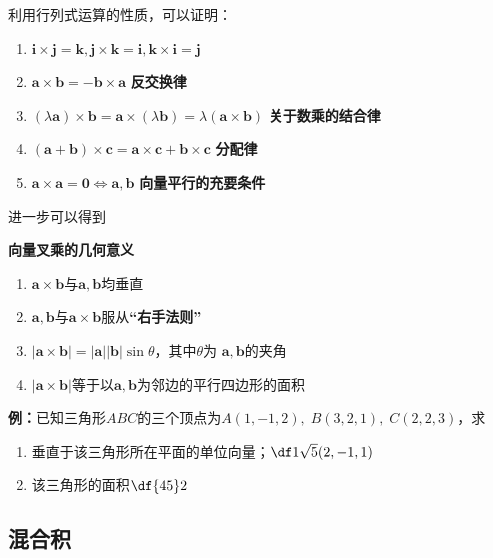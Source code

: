 利用行列式运算的性质，可以证明：
\begin{thx}
	\begin{enumerate}
	  \item $\bm{i}\times\bm{j}=\bm{k},\bm{j}\times\bm{k}=\bm{i},
		\bm{k}\times\bm{i}=\bm{j}$
	  \item $\bm{a}\times\bm{b}=-\bm{b}\times\bm{a}$
	  \hfill {\bf 反交换律}
	  \item 
	  $(\lambda\bm{a})\times\bm{b}=\bm{a}\times(\lambda\bm{b})
	  =\lambda(\bm{a}\times\bm{b})$
	  \hfill {\bf 关于数乘的结合律}
	  \item 
	  $(\bm{a}+\bm{b})\times\bm{c}=\bm{a}\times\bm{c}+\bm{b}\times\bm{c}$
	  \hfill {\bf 分配律}
	  \item $\bm{a}\times\bm{a}=\bm{0}\Leftrightarrow\bm{a},\bm{b}$
	  \hfill {\bf 向量平行的充要条件}
	\end{enumerate}
\end{thx}

进一步可以得到
\begin{thx}
	{\bf 向量叉乘的几何意义}
	\begin{enumerate}%
	  \item $\bm{a}\times\bm{b}$与$\bm{a},\bm{b}$均垂直
	  \item $\bm{a},\bm{b}$与$\bm{a}\times\bm{b}$服从{\bf “右手法则”}
	  \item $|\bm{a}\times\bm{b}|=|\bm{a}||\bm{b}|\sin\theta$，其中$\theta$为
	  $\bm{a},\bm{b}$的夹角
	  \item $|\bm{a}\times\bm{b}|$等于以$\bm{a},\bm{b}$为邻边的平行四边形的面积
	\end{enumerate}
\end{thx}

{\bf 例：}已知三角形$ABC$的三个顶点为$A(1,-1,2),\;B(3,2,1),\;C(2,2,3)$，求
\begin{enumerate}[(1)]
  \setlength{\itemindent}{1cm}
  \item 垂直于该三角形所在平面的单位向量；\hfill $\df1{\sqrt5}(2,-1,1)$
  \item 该三角形的面积\hfill $\df{45}2$
\end{enumerate}

\subsection{混合积}


